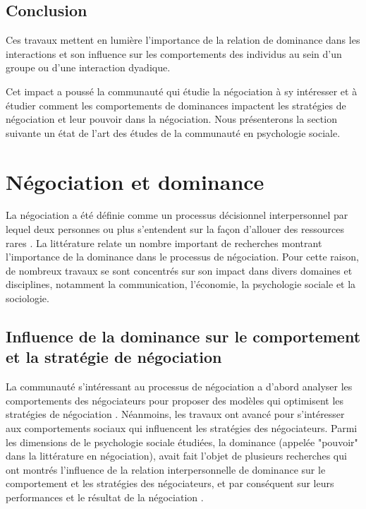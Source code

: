 		\subsection{Conclusion}
			
			Ces travaux mettent en lumière l'importance de la relation de dominance dans les interactions et son influence sur les comportements des individus au sein d'un groupe ou d'une interaction dyadique.
			
			Cet impact a poussé la communauté qui étudie la négociation à sy intéresser et à étudier comment les comportements de dominances impactent les stratégies de négociation et leur pouvoir dans la négociation. 
			Nous présenterons la section suivante un état de l'art des études de la communauté en psychologie sociale.
			
			
	\section{Négociation et dominance}
	\label{sec:domNego}
	La négociation a été définie comme un processus décisionnel interpersonnel par lequel deux personnes ou plus s'entendent sur la façon d'allouer des ressources rares \cite{thompson2000mind}. La littérature  relate un nombre important de recherches \cite{de1995impact,van2006power,fiske1993controlling} montrant l'importance de la dominance dans le processus de négociation. Pour cette raison, de nombreux travaux se sont concentrés sur son impact dans divers domaines et disciplines, notamment la communication, l'économie, la psychologie sociale et la sociologie.
	

	
	\subsection{Influence de la dominance sur le comportement et la stratégie de négociation}
	
	La communauté s'intéressant au processus de négociation a d'abord analyser les comportements des négociateurs pour proposer des modèles qui optimisent les stratégies de négociation \cite{thompson2010negotiation}.
	Néanmoins, les travaux ont avancé pour s'intéresser aux comportements sociaux qui influencent les stratégies des négociateurs. Parmi les dimensions de le psychologie sociale étudiées, la dominance  (appelée "pouvoir" dans la littérature en négociation), avait fait l'objet de plusieurs recherches qui ont montrés l'influence  de la relation interpersonnelle de dominance sur le comportement et les stratégies des négociateurs, et par conséquent sur leurs performances et le résultat de la négociation \cite{de1995impact,van2006power}.
	
